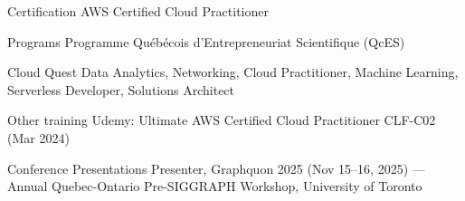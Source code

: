 
\begin{cvskills}
\cvskill
{Certification}
{AWS Certified Cloud Practitioner}

\cvskill
{Programs}
{Programme Québécois d'Entrepreneuriat Scientifique (QcES)}

\cvskill
{Cloud Quest}
{Data Analytics, Networking, Cloud Practitioner, Machine Learning, Serverless Developer, Solutions Architect}

\cvskill
{Other training}
{Udemy: Ultimate AWS Certified Cloud Practitioner CLF-C02 (Mar 2024)}

\cvskill
{Conference Presentations}
{Presenter, Graphquon 2025 (Nov 15--16, 2025) --- Annual Quebec-Ontario Pre-SIGGRAPH Workshop, University of Toronto}
\end{cvskills}
